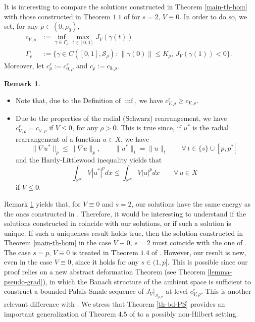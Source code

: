 \documentclass[11pt,reqno]{amsart}
\theoremstyle{definition}
\newtheorem{remark}[theorem]{Remark}
\numberwithin{equation}{section}
\numberwithin{theorem}{section}
\numberwithin{equation}{section}
\numberwithin{theorem}{section}
\newcommand{\R}{\mathbb{R}}
\begin{document}
It is interesting to compare the solutions constructed in Theorem \ref{main-th-hom} with those constructed in Theorem $1.1$ of \cite{WLZL} for $s=2,\, V\equiv 0$. In order to do so, we set, for any $\rho\in(0,\rho_0)$,
\begin{equation}
\begin{aligned}
c_{V,\rho}&:=\inf_{\gamma\in\Gamma_{\rho}}\max_{t\in[0,1]}J_V(\gamma(t))\\
\Gamma_{\rho}&:=\{\gamma\in C([0,1],\mathcal{S}_{\rho}):\,\|\gamma(0)\|\le K_\rho,\,J_V(\gamma(1))<0\}.
\end{aligned}     
\end{equation}
Moreover, let $c_\rho^r:=c^{r}_{0,\rho}$ and $c_\rho:=c_{0,\rho}$.
\begin{remark}\label{rem-rearrangement}
\begin{itemize}
\item Note that, due to the Definition of $\inf$, we have $c^r_{V,\rho}\ge c_{V,\rho}$.
\item Due to the properties of the radial (Schwarz) rearrangement, we have $c_{V,\rho}^r=c_{V,\rho}$ if $V\le 0$, for any $\rho>0$. This is true since, if $u^*$ is the radial rearrangement of a function $u\in X$, we have
$$\|\nabla u^*\|_p\le \|\nabla u\|_p,\qquad\|u^*\|_t=\|u\|_t\qquad\forall\,t\in\{s\}\cup[p,p^*]$$
and the Hardy-Littlewood inequality yields that
$$\int_{\R^N}V|u^*|^p dx\le \int_{\R^N}V|u|^p dx\qquad\forall\,u\in X$$
if $V\le 0$. %
\end{itemize}
\end{remark}
Remark \ref{rem-rearrangement} yields that, for $V\equiv 0$ and $s=2$, our solutions have the same energy as the ones constructed in \cite{WLZL}. Therefore, it would be interesting to understand if the solutions constructed in \cite{WLZL} coincide with our solutions, or if such a solution is unique. If such a uniqueness result holds true, then the solution constructed in Theorem \ref{main-th-hom} in the case $V\equiv 0,\,s=2$ must coincide with the one of \cite{WLZL}.\\

The case $s=p,\, V\equiv0$ is treated in Theorem $1.4$ of \cite{zhang2022normalized}. However, our result is new, even in the case $V\equiv 0$, since it holds for any $s\in(1,p]$. This is possible since our proof relies on a new abstract deformation Theorem (see Theorem \ref{lemma-pseudo-grad}), in which the Banach structure of the ambient space is sufficient to construct a bounded Palais-Smale sequence of $J_V|_{\mathcal{S}_{\rho,r}}$ at level $c^r_{V,\rho}$. This is another relevant difference with \cite{WLZL}. We stress that Theorem \ref{th-bd-PS} provides an important generalization of Theorem $4.5$ of \cite{ghoussoub1993duality} to a possibly non-Hilbert setting.\\
\end{document}
